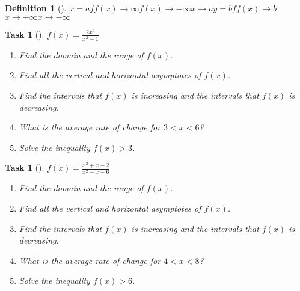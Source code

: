 \documentclass[10pt,]{article}
\theoremstyle{plain}
\newtheorem{proposition}[theorem]{Task}
\theoremstyle{definition}
\newtheorem{definition}[theorem]{Definition}
\numberwithin{equation}{section}
\newcommand{\lt}{<}
\newcommand{\gt}{>}
\begin{document}
\begin{definition}[{}]\label{definition-4}
\(x=a\)\(f\)\(f(x) \to \infty\)\(f(x) \to -\infty\)\(x \to a\)\(y=b\)\(f\)\(f(x) \to b\)\(x \to +\infty\)\(x \to -\infty\)\end{definition}
\begin{proposition}[{}]\label{proposition-44}
\(f(x) = \frac{2x^2}{x^2-1}\)\leavevmode%
\begin{enumerate}
\item\hypertarget{li-228}{}Find the domain and the range of \(f(x)\).%
\item\hypertarget{li-229}{}Find all the vertical and horizontal asymptotes of \(f(x)\).%
\item\hypertarget{li-230}{}Find the intervals that \(f(x)\) is increasing and the intervals that \(f(x)\) is decreasing.%
\item\hypertarget{li-231}{}What is the average rate of change for \(3 \lt x \lt 6\)?%
\item\hypertarget{li-232}{}Solve the inequality \(f(x) \gt 3\).%
\end{enumerate}
\end{proposition}
\begin{proposition}[{}]\label{proposition-45}
\(f(x) = \frac{x^2+x-2}{x^2-x-6}\)\leavevmode%
\begin{enumerate}
\item\hypertarget{li-233}{}Find the domain and the range of \(f(x)\).%
\item\hypertarget{li-234}{}Find all the vertical and horizontal asymptotes of \(f(x)\).%
\item\hypertarget{li-235}{}Find the intervals that \(f(x)\) is increasing and the intervals that \(f(x)\) is decreasing.%
\item\hypertarget{li-236}{}What is the average rate of change for \(4 \lt x \lt 8\)?%
\item\hypertarget{li-237}{}Solve the inequality \(f(x) \gt 6\).%
\end{enumerate}
\end{proposition}
\typeout{************************************************}
\typeout{************************************************}
\end{document}
